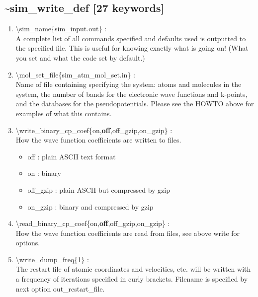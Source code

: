 \documentclass[12pt,titlepage]{article}
\begin{document}
\subsection*{\bf \~{}sim\_write\_def [27 keywords]}
\begin{enumerate}

 \vspace{0.15in} 
 \item   \textbackslash sim\_name\{sim\_input.out\} : \\
    A complete list of all commands specified and defaults used is outputted to the specified file.  This is useful for knowing exactly what is going on!  (What you set and what the code set by default.)

\vspace{0.15in} 
 \item   \textbackslash mol\_set\_file\{sim\_atm\_mol\_set.in\} : \\
    Name of file containing specifying the system: atoms and molecules in the system, the number of bands for the electronic wave functions and k-points, and the databases for the pseudopotentials.  Please see the HOWTO above for examples of what this contains.

\vspace{0.15in} 
 \item   \textbackslash write\_binary\_cp\_coef\{on,{\bf off},off\_gzip,on\_gzip\} : \\
 How the wave function coefficients are written to files.
 \begin{itemize}
\item off : plain ASCII text format
\item on : binary
\item off\_gzip : plain ASCII but compressed by gzip
\item on\_gzip : binary and compressed by gzip
 \end{itemize}
 
\vspace{0.15in} 
 \item   \textbackslash read\_binary\_cp\_coef\{on,{\bf off},off\_gzip,on\_gzip\} : \\
 How the wave function coefficients are read from files, see above write for options.



 \vspace{0.15in} 
 \item   \textbackslash write\_dump\_freq\{1\} : \\
     The restart file of atomic coordinates and velocities, etc. will be
     written with a frequency of iterations specified in curly brackets.  Filename is specified by
     next option out\_restart\_file.


\end{enumerate}
\end{document}
